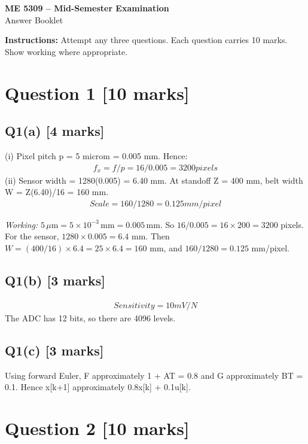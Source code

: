 \documentclass[11pt,a4paper]{article}
\begin{document}
\begin{center}
{\Large\bfseries ME 5309 -- Mid-Semester Examination}\\[3pt]
{\large Answer Booklet}\\[8pt]
\end{center}
\textbf{Instructions:} Attempt any three questions. Each question carries 10 marks. Show working where appropriate.
\section*{Question 1 \hfill [10 marks]}
\subsection*{Q1(a) \hfill [4 marks]}

(i) Pixel pitch p = 5 microm = 0.005 mm.
Hence:\[\begin{aligned}f_x = f/p = 16/0.005 = 3200 pixels\end{aligned}\]
(ii) Sensor width = 1280(0.005) = 6.40 mm.
At standoff Z = 400 mm, belt width W = Z(6.40)/16 = 160 mm.
\[\begin{aligned}Scale = 160/1280 = 0.125 mm/pixel\end{aligned}\]\par\smallskip\textit{Working:} $5\,\mu\mathrm{m}=5\times10^{-3}\,\mathrm{mm}=0.005\,\mathrm{mm}$. So $16/0.005=16\times200=3200$ pixels. For the sensor, $1280\times0.005=6.4$ mm. Then $W=(400/16)\times6.4=25\times6.4=160$ mm, and $160/1280=0.125$ mm/pixel.

\subsection*{Q1(b) \hfill [3 marks]}

\[\begin{aligned}Sensitivity = 10 mV/N\end{aligned}\]
The ADC has 12 bits, so there are 4096 levels.

\subsection*{Q1(c) \hfill [3 marks]}

Using forward Euler, F approximately 1 + AT = 0.8 and G approximately BT = 0.1.
Hence x[k+1] approximately 0.8x[k] + 0.1u[k].

\section*{Question 2 \hfill [10 marks]}
\end{document}

